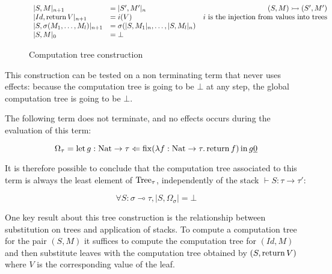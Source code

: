 \begin{figure}[h!]
    \begin{center}
        \begin{equation*}
            \begin{array}{llr}
                |S,M|_{n+1} &= |S',M'|_n & (S,M) \reduces (S',M') \\
                |Id,\Ret V|_{n+1} &= i(V) & i \text{ is the injection from values into
                trees} \\
                |S,\sigma(M_1, \dots, M_l)|_{n+1} &= \sigma (|S, M_1|_n, \dots,|S,M_l|_n) \\
                |S,M|_0 &= \bot \\
            \end{array}
        \end{equation*}
    \end{center}
    \caption{Computation tree construction}
    \label{fig:treecalcul}
\end{figure}

This construction can be tested on a non terminating term 
that never uses effects:
because the computation tree is going to be $\bot$ at any 
step, the global computation tree is going to be $\bot$.


\begin{example}
    The following term does not terminate, and no effects occurs 
    during the evaluation of this term:
    
    \begin{equation*}
        \Omega_\tau = \Bind{\Fix (\lambda f : \Nat \to \tau. \Ret f
        )}{g : \Nat \to \tau}{g \underline{0}}
    \end{equation*}

    It is therefore possible to conclude that the computation tree
    associated to this term is always the least element of $\Tree_\tau$,
    independently of the stack $\vdash S : \tau \to \tau'$:

    \begin{equation*}
        \forall S : \sigma \multimap \tau, |S, \Omega_\sigma| = \bot
    \end{equation*}
\end{example}


One key result about this tree construction is the relationship between 
substitution on trees and application of stacks. To compute a computation 
tree for the pair $(S,M)$ it suffices to compute the computation tree 
for $(Id,M)$ and then substitute leaves with the computation tree obtained 
by $(S,\Ret V)$ where $V$ is the corresponding value of the leaf.

